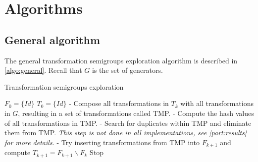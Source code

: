 {%

\section{ Algorithms}
\label{part:algo}
\subsection{General algorithm}
The general transformation semigroups exploration algorithm is described in \autoref{algo:general}.
Recall that $G$ is the set of generators.

\begin{algorithm}
\caption{Transformation semigroups exploration}
\label{algo:general}
\begin{algorithmic}
\STATE $F_0 = \{Id\}$
\STATE $T_0 = \{Id\}$
\STATE - Compose all transformations in $T_k$ with all transformations in $G$, resulting in a set of transformations called TMP.
\STATE - Compute the hash values of all transformations in TMP.
\STATE - Search for duplicates within TMP and eliminate them from TMP.
\emph{This step is not done in all implementations, see \autoref{part:results} for more details.}
\STATE - Try inserting transformations from TMP into $F_{k+1}$ and compute $T_{k+1}=F_{k+1} \backslash F_k$
\STATE Stop
\ENDIF
\ENDFOR
\end{algorithmic}
\end{algorithm}

}
